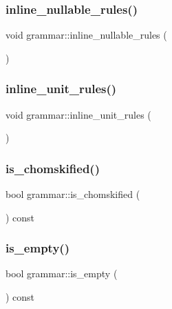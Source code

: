 \mbox{\label{classgrammar_ab1161361d2865e305c3c40d1f8de6a6b}} 
\subsubsection{\texorpdfstring{inline\_nullable\_rules()}{inline\_nullable\_rules()}}
{\footnotesize\ttfamily void grammar\+::inline\+\_\+nullable\+\_\+rules (\begin{DoxyParamCaption}{ }\end{DoxyParamCaption})}

\mbox{\label{classgrammar_a91f3c8916ed850bc38f347480349c123}} 
\subsubsection{\texorpdfstring{inline\_unit\_rules()}{inline\_unit\_rules()}}
{\footnotesize\ttfamily void grammar\+::inline\+\_\+unit\+\_\+rules (\begin{DoxyParamCaption}{ }\end{DoxyParamCaption})}

\mbox{\label{classgrammar_a1be2558728bfb9d77d4f7dc373dc00d2}} 
\subsubsection{\texorpdfstring{is\_chomskified()}{is\_chomskified()}}
{\footnotesize\ttfamily bool grammar\+::is\+\_\+chomskified (\begin{DoxyParamCaption}{ }\end{DoxyParamCaption}) const}

\mbox{\label{classgrammar_a1d5ab32a94db0da5dfde871e5d9ce19a}} 
\subsubsection{\texorpdfstring{is\_empty()}{is\_empty()}}
{\footnotesize\ttfamily bool grammar\+::is\+\_\+empty (\begin{DoxyParamCaption}{ }\end{DoxyParamCaption}) const}

